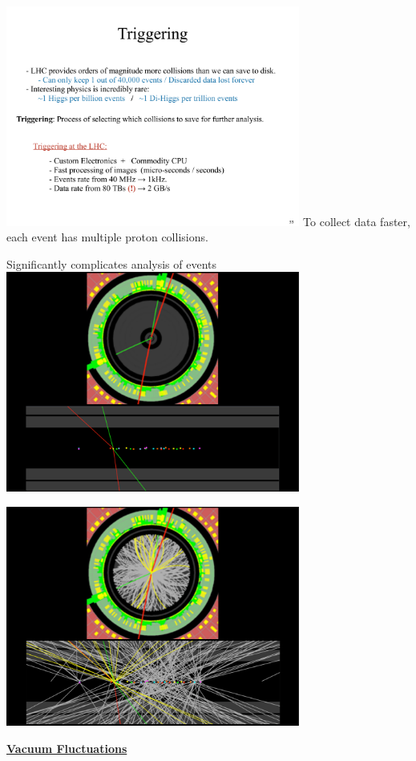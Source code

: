{\bc
\includegraphics[width=0.725\textwidth]{./Triggering.pdf}
\ec
\lineacross
To collect data faster, each event has multiple proton collisions.

Significantly complicates analysis of events
\bc
\includegraphics[width=0.725\textwidth]{./NoPileUp.pdf}
\ec


\bc
\includegraphics[width=0.725\textwidth]{./PileUp.pdf}
\ec

\clearpage

\underline{\textbf{Vacuum Fluctuations}}

}
